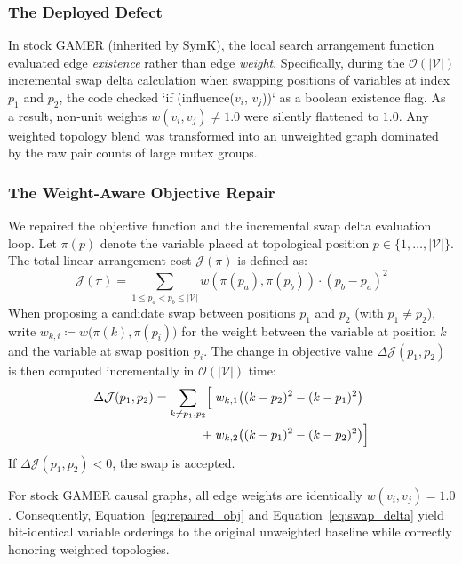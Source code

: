 \documentclass[twocolumn,10pt]{article}
\begin{document}
\subsubsection{The Deployed Defect}
In stock \textsf{GAMER} (inherited by \textsf{SymK}), the local search arrangement function evaluated edge \emph{existence} rather than edge \emph{weight}. Specifically, during the $\mathcal{O}(|\mathcal{V}|)$ incremental swap delta calculation when swapping positions of variables at index $p_1$ and $p_2$, the code checked `if (influence($v_i$, $v_j$))` as a boolean existence flag. As a result, non-unit weights $w(v_i, v_j) \neq 1.0$ were silently flattened to $1.0$. Any weighted topology blend was transformed into an unweighted graph dominated by the raw pair counts of large mutex groups.

\subsubsection{The Weight-Aware Objective Repair}
We repaired the objective function and the incremental swap delta evaluation loop. Let $\pi(p)$ denote the variable placed at topological position $p \in \{1, \dots, |\mathcal{V}|\}$. The total linear arrangement cost $\mathcal{J}(\pi)$ is defined as:
\begin{equation}
    \mathcal{J}(\pi) = \sum_{1 \le p_a < p_b \le |\mathcal{V}|} w\left(\pi(p_a), \pi(p_b)\right) \cdot (p_b - p_a)^2
    \label{eq:repaired_obj}
\end{equation}
When proposing a candidate swap between positions $p_1$ and $p_2$ (with $p_1 \neq p_2$), write $w_{k,i} \coloneqq w\bigl(\pi(k), \pi(p_i)\bigr)$ for the weight between the variable at position $k$ and the variable at swap position $p_i$. The change in objective value $\Delta \mathcal{J}(p_1, p_2)$ is then computed incrementally in $\mathcal{O}(|\mathcal{V}|)$ time:
\begin{equation}
\begin{aligned}
    \Delta \mathcal{J}(p_1, p_2) = \sum_{k \neq p_1, p_2} \Bigl[ \; &w_{k,1}\bigl( (k - p_2)^2 - (k - p_1)^2 \bigr) \\
    + \; &w_{k,2}\bigl( (k - p_1)^2 - (k - p_2)^2 \bigr) \Bigr]
\end{aligned}
\label{eq:swap_delta}
\end{equation}
If $\Delta \mathcal{J}(p_1, p_2) < 0$, the swap is accepted.

\begin{insightbox}
For stock \textsf{GAMER} causal graphs, all edge weights are identically $w(v_i, v_j) = 1.0$. Consequently, Equation~\ref{eq:repaired_obj} and Equation~\ref{eq:swap_delta} yield bit-identical variable orderings to the original unweighted baseline while correctly honoring weighted topologies.
\end{insightbox}
\end{document}
